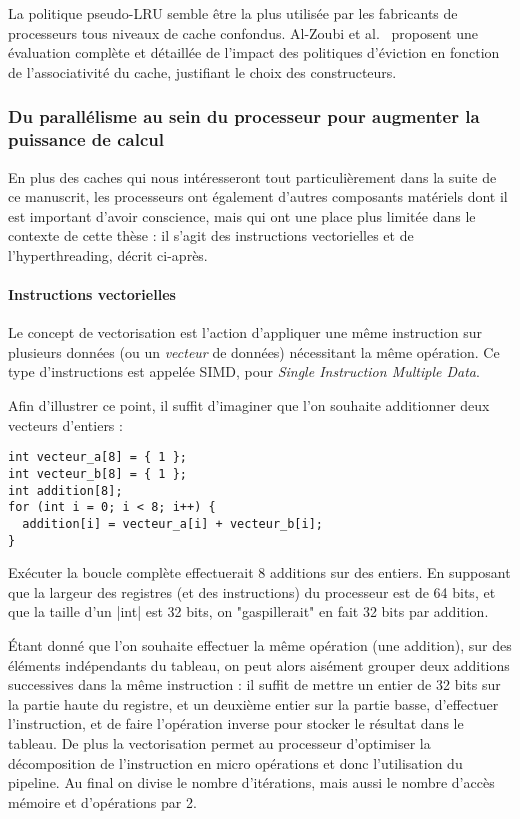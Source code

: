 La politique pseudo-LRU semble être la plus utilisée par les fabricants de processeurs tous niveaux de cache confondus. Al-Zoubi et al.~\cite{Al-Zoubi2004} proposent une évaluation complète et détaillée de l'impact des politiques d'éviction en fonction de l'associativité du cache, justifiant le choix des constructeurs.



\subsubsection{Du parallélisme au sein du processeur pour augmenter la puissance de calcul}\label{sec:context:numa:node}

En plus des caches qui nous intéresseront tout particulièrement dans la suite de ce manuscrit, les processeurs ont également d'autres composants matériels dont il est important d'avoir conscience, mais qui ont une place plus limitée dans le contexte de cette thèse : il s'agit des instructions vectorielles et de l'hyperthreading, décrit ci-après.

\paragraph{Instructions vectorielles}\label{sec:context:numa:simd}

Le concept de vectorisation est l'action d'appliquer une même instruction sur plusieurs données (ou un \emph{vecteur} de données) nécessitant la même opération.
Ce type d'instructions est appelée SIMD, pour \emph{Single Instruction Multiple Data}.

Afin d'illustrer ce point, il suffit d'imaginer que l'on souhaite additionner deux vecteurs d'entiers :
\begin{lstlisting}
int vecteur_a[8] = { 1 };
int vecteur_b[8] = { 1 };
int addition[8];
for (int i = 0; i < 8; i++) {
  addition[i] = vecteur_a[i] + vecteur_b[i];
}
\end{lstlisting}

Exécuter la boucle complète effectuerait 8 additions sur des entiers.
En supposant que la largeur des registres (et des instructions) du processeur est de 64 bits, et que la taille d'un |int| est 32 bits, on "gaspillerait" en fait 32 bits par addition.

Étant donné que l'on souhaite effectuer la même opération (une addition), sur des éléments indépendants du tableau, on peut alors aisément grouper deux additions successives dans la même instruction : il suffit de mettre un entier de 32 bits sur la partie haute du registre, et un deuxième entier sur la partie basse, d'effectuer l'instruction, et de faire l'opération inverse pour stocker le résultat dans le tableau.
De plus la vectorisation permet au processeur d'optimiser la décomposition de l'instruction en micro opérations et donc l'utilisation du pipeline.
Au final on divise le nombre d'itérations, mais aussi le nombre d'accès mémoire et d'opérations par 2.


